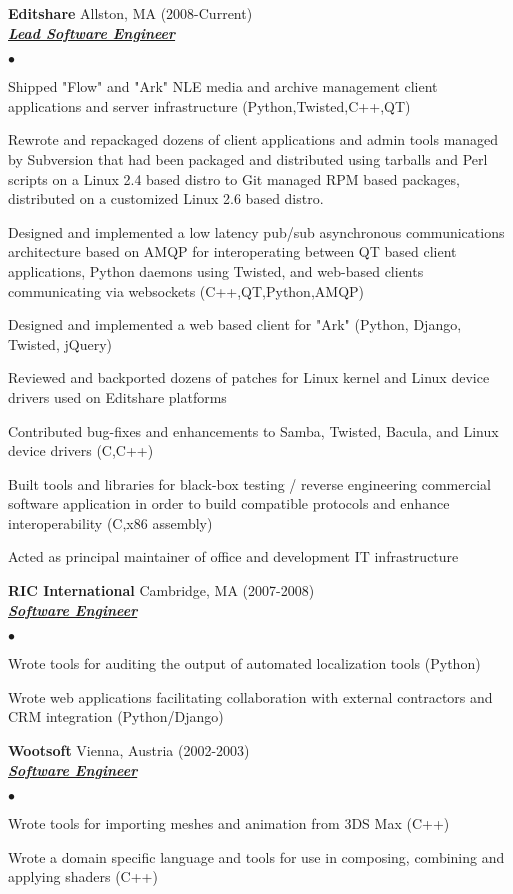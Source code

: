 \documentclass{article}
\newcommand{\employer}[4]{{ \textbf{#1} #2 (#3)\\ \underline{\textbf{\emph{#4}}}\\  }}
\newenvironment{achievements}{\begin{list}{$\bullet$}{\topsep 0pt \itemsep -2pt}}{\vspace*{4pt}\end{list}}
\begin{document}
	\employer{Editshare}	{Allston, MA}	{2008-Current}	{Lead Software Engineer}
	\begin{achievements}
	\item Shipped "Flow" and "Ark" NLE media and archive management client applications and server infrastructure (Python,Twisted,C++,QT)
	\item Rewrote and repackaged dozens of client applications and admin tools managed by Subversion that had been packaged and distributed using tarballs and Perl scripts on a Linux 2.4 based distro to Git managed RPM based packages, distributed on a customized Linux 2.6 based distro.
	\item Designed and implemented a low latency pub/sub asynchronous communications architecture based on AMQP for interoperating between QT based client applications, Python daemons using Twisted, and web-based clients communicating via websockets (C++,QT,Python,AMQP)
	\item Designed and implemented a web based client for "Ark" (Python, Django, Twisted, jQuery)
	\item Reviewed and backported dozens of patches for Linux kernel and Linux device drivers used on Editshare platforms
	\item Contributed bug-fixes and enhancements to Samba, Twisted, Bacula, and Linux device drivers (C,C++)
	\item Built tools and libraries for black-box testing / reverse engineering commercial software application in order to build compatible protocols and enhance interoperability (C,x86 assembly)
	\item Acted as principal maintainer of office and development IT infrastructure
	\end{achievements}

	\employer{RIC International}	{Cambridge, MA}	{2007-2008}	{Software Engineer}
	\begin{achievements}
	\item Wrote tools for auditing the output of automated localization tools (Python)
	\item Wrote web applications facilitating collaboration with external contractors and CRM integration (Python/Django)
	\end{achievements}

	\employer{Wootsoft}		{Vienna, Austria}	{2002-2003}	{Software Engineer}
	\begin{achievements}
	\item Wrote tools for importing meshes and animation from 3DS Max (C++)
	\item Wrote a domain specific language and tools for use in composing, combining and applying shaders (C++)
	\end{achievements}
\end{document}
